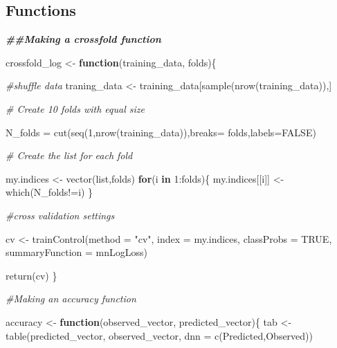 \documentclass[
]{article}
\newenvironment{Shaded}{\begin{snugshade}}{\end{snugshade}}
\newcommand{\AttributeTok}[1]{\textcolor[rgb]{0.77,0.63,0.00}{#1}}
\newcommand{\CommentTok}[1]{\textcolor[rgb]{0.56,0.35,0.01}{\textit{#1}}}
\newcommand{\ConstantTok}[1]{\textcolor[rgb]{0.00,0.00,0.00}{#1}}
\newcommand{\ControlFlowTok}[1]{\textcolor[rgb]{0.13,0.29,0.53}{\textbf{#1}}}
\newcommand{\DecValTok}[1]{\textcolor[rgb]{0.00,0.00,0.81}{#1}}
\newcommand{\DocumentationTok}[1]{\textcolor[rgb]{0.56,0.35,0.01}{\textbf{\textit{#1}}}}
\newcommand{\FunctionTok}[1]{\textcolor[rgb]{0.00,0.00,0.00}{#1}}
\newcommand{\NormalTok}[1]{#1}
\newcommand{\OtherTok}[1]{\textcolor[rgb]{0.56,0.35,0.01}{#1}}
\newcommand{\SpecialCharTok}[1]{\textcolor[rgb]{0.00,0.00,0.00}{#1}}
\newcommand{\StringTok}[1]{\textcolor[rgb]{0.31,0.60,0.02}{#1}}
\begin{document}
\hypertarget{functions}{%
\subsection{Functions}\label{functions}}

\begin{Shaded}
\begin{Highlighting}[]
\DocumentationTok{\#\#Making a crossfold function}

\NormalTok{crossfold\_log }\OtherTok{\textless{}{-}} \ControlFlowTok{function}\NormalTok{(training\_data, folds)\{}
  
  \CommentTok{\#shuffle data}
\NormalTok{  traning\_data }\OtherTok{\textless{}{-}}\NormalTok{ training\_data[}\FunctionTok{sample}\NormalTok{(}\FunctionTok{nrow}\NormalTok{(training\_data)),]}
  

    \CommentTok{\# Create 10 folds with equal size}

\NormalTok{      N\_folds }\OtherTok{=} \FunctionTok{cut}\NormalTok{(}\FunctionTok{seq}\NormalTok{(}\DecValTok{1}\NormalTok{,}\FunctionTok{nrow}\NormalTok{(training\_data)),}\AttributeTok{breaks=}\NormalTok{ folds,}\AttributeTok{labels=}\ConstantTok{FALSE}\NormalTok{)}
  
    \CommentTok{\# Create the list for each fold }
      
\NormalTok{      my.indices }\OtherTok{\textless{}{-}} \FunctionTok{vector}\NormalTok{(}\StringTok{\textquotesingle{}list\textquotesingle{}}\NormalTok{,folds)}
      \ControlFlowTok{for}\NormalTok{(i }\ControlFlowTok{in} \DecValTok{1}\SpecialCharTok{:}\NormalTok{folds)\{}
\NormalTok{        my.indices[[i]] }\OtherTok{\textless{}{-}} \FunctionTok{which}\NormalTok{(N\_folds}\SpecialCharTok{!=}\NormalTok{i)}
\NormalTok{      \}}
      
      \CommentTok{\#cross validation settings}
      
\NormalTok{      cv }\OtherTok{\textless{}{-}} \FunctionTok{trainControl}\NormalTok{(}\AttributeTok{method    =} \StringTok{"cv"}\NormalTok{,}
                   \AttributeTok{index           =}\NormalTok{ my.indices,}
                   \AttributeTok{classProbs      =} \ConstantTok{TRUE}\NormalTok{,}
                   \AttributeTok{summaryFunction =}\NormalTok{ mnLogLoss)}
      
      
\FunctionTok{return}\NormalTok{(cv)}
\NormalTok{\}}

\CommentTok{\#Making an accuracy function }

\NormalTok{accuracy }\OtherTok{\textless{}{-}} \ControlFlowTok{function}\NormalTok{(observed\_vector, predicted\_vector)\{}
\NormalTok{tab }\OtherTok{\textless{}{-}} \FunctionTok{table}\NormalTok{(predicted\_vector,}
\NormalTok{             observed\_vector,}
             \AttributeTok{dnn =} \FunctionTok{c}\NormalTok{(}\StringTok{\textquotesingle{}Predicted\textquotesingle{}}\NormalTok{,}\StringTok{\textquotesingle{}Observed\textquotesingle{}}\NormalTok{))}




\end{Highlighting}
\end{Shaded}
\end{document}
